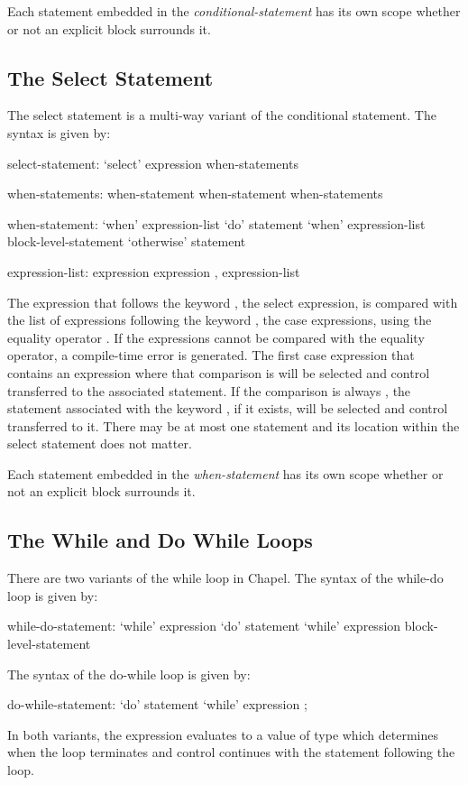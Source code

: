 Each statement embedded in the {\em conditional-statement} has its own
scope whether or not an explicit block surrounds it.

\subsection{The Select Statement}
\label{The_Select_Statement}


The select statement is a multi-way variant of the conditional
statement.  The syntax is given by:
\begin{syntax}
select-statement:
  `select' expression { when-statements }

when-statements:
  when-statement
  when-statement when-statements

when-statement:
  `when' expression-list `do' statement
  `when' expression-list block-level-statement
  `otherwise' statement

expression-list:
  expression
  expression , expression-list
\end{syntax}
The expression that follows the keyword , the select
expression, is compared with the list of expressions following the
keyword , the case expressions, using the equality
operator \chpl{==}.  If the expressions cannot be compared with the
equality operator, a compile-time error is generated.  The first case
expression that contains an expression where that comparison
is  will be selected and control transferred to the
associated statement.  If the comparison is always , the
statement associated with the keyword , if it exists,
will be selected and control transferred to it.  There may be at most
one  statement and its location within the select
statement does not matter.

Each statement embedded in the {\em when-statement} has its own scope
whether or not an explicit block surrounds it.

\subsection{The While and Do While Loops}
\label{The_While_and_Do_While_Loops}


There are two variants of the while loop in Chapel.  The syntax of the
while-do loop is given by:
\begin{syntax}
while-do-statement:
  `while' expression `do' statement
  `while' expression block-level-statement
\end{syntax}
The syntax of the do-while loop is given by:
\begin{syntax}
do-while-statement:
  `do' statement `while' expression ;
\end{syntax}
In both variants, the expression evaluates to a value of type 
which determines when the loop terminates and control continues with
the statement following the loop.

